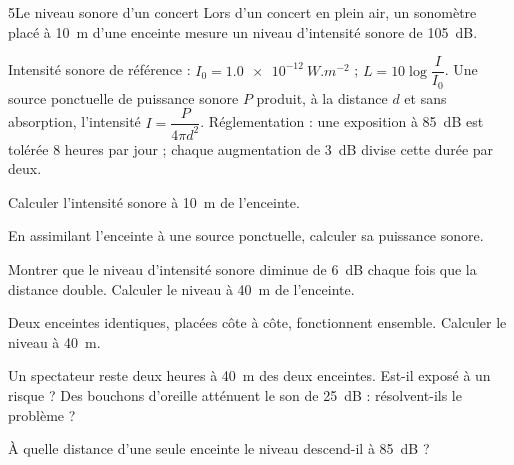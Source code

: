 \begin{exoBac}{5}{Le niveau sonore d'un concert}
Lors d'un concert en plein air, un sonomètre placé à \qty{10}{m} d'une enceinte mesure un niveau d'intensité sonore de \qty{105}{dB}.
\begin{donnees}
Intensité sonore de référence : $I_0=\qty{1,0e-12}{W.m^{-2}}$ ; $L=10\log\dfrac{I}{I_0}$. Une source ponctuelle de puissance sonore $P$
produit, à la distance $d$ et sans absorption, l'intensité $I=\dfrac{P}{4\pi d^2}$. Réglementation : une exposition à \qty{85}{dB}
est tolérée 8 heures par jour ; chaque augmentation de \qty{3}{dB} divise cette durée par deux.
\end{donnees}
\begin{questions}
\item Calculer l'intensité sonore à \qty{10}{m} de l'enceinte.
\item En assimilant l'enceinte à une source ponctuelle, calculer sa puissance sonore.
\item Montrer que le niveau d'intensité sonore diminue de \qty{6}{dB} chaque fois que la distance double. Calculer le niveau à
\qty{40}{m} de l'enceinte.
\item Deux enceintes identiques, placées côte à côte, fonctionnent ensemble. Calculer le niveau à \qty{40}{m}.
\item \initiative Un spectateur reste deux heures à \qty{40}{m} des deux enceintes. Est-il exposé à un risque ? Des bouchons d'oreille
atténuent le son de \qty{25}{dB} : résolvent-ils le problème ?
\item À quelle distance d'une seule enceinte le niveau descend-il à \qty{85}{dB} ?
\end{questions}
\end{exoBac}

